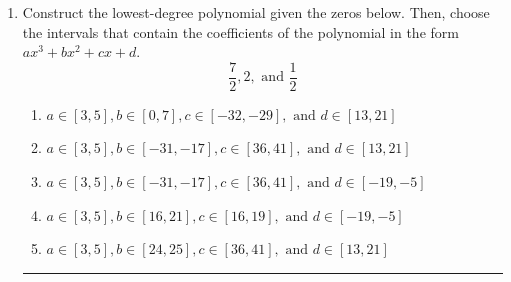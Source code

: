 \documentclass[14pt]{extbook}
\newcommand{\litem}[1]{\item#1\hspace*{-1cm}\rule{\textwidth}{0.4pt}}
\begin{document}
\begin{enumerate}
\litem{
Construct the lowest-degree polynomial given the zeros below. Then, choose the intervals that contain the coefficients of the polynomial in the form $ax^3+bx^2+cx+d$.\[ \frac{7}{2}, 2, \text{ and } \frac{1}{2} \]\begin{enumerate}[label=\Alph*.]
\item \( a \in [3, 5], b \in [0, 7], c \in [-32, -29], \text{ and } d \in [13, 21] \)
\item \( a \in [3, 5], b \in [-31, -17], c \in [36, 41], \text{ and } d \in [13, 21] \)
\item \( a \in [3, 5], b \in [-31, -17], c \in [36, 41], \text{ and } d \in [-19, -5] \)
\item \( a \in [3, 5], b \in [16, 21], c \in [16, 19], \text{ and } d \in [-19, -5] \)
\item \( a \in [3, 5], b \in [24, 25], c \in [36, 41], \text{ and } d \in [13, 21] \)


\end{enumerate}}
\end{enumerate}
\end{document}
